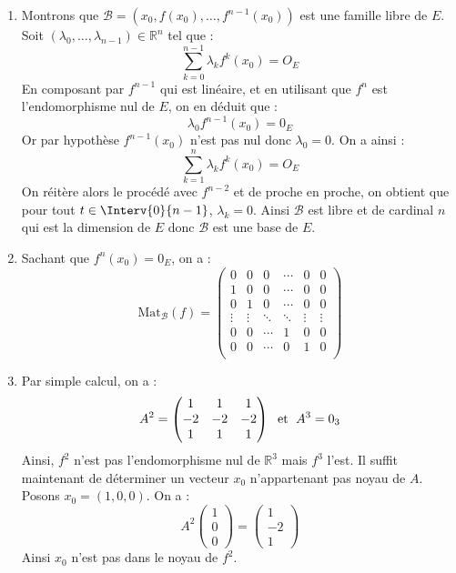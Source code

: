 \documentclass[a4paper,10pt]{report}
\begin{document}
\begin{enumerate}
\item Montrons que $\mathcal{B}= (x_0, f(x_0), \ldots, f^{n-1}(x_0))$ est une famille libre de $E$. Soit $(\lambda_0, \ldots, \lambda_{n-1}) \in \mathbb{R}^n$ tel que :
$$ \sum_{k=0}^{n-1} \lambda_k f^k (x_0) = O_E$$
En composant par $f^{n-1}$ qui est linéaire, et en utilisant que $f^n$ est l'endomorphisme nul de $E$, on en déduit que :
$$ \lambda_0 f^{n-1}(x_0)=0_E$$
Or par hypothèse $f^{n-1}(x_0)$ n'est pas nul donc $\lambda_0=0$. On a ainsi :
$$ \sum_{k=1}^n \lambda_k f^k (x_0) = O_E$$
On réitère alors le procédé avec $f^{n-2}$ et de proche en proche, on obtient que pour tout $t \in \Interv{0}{n-1}$, $\lambda_k=0$. Ainsi $\mathcal{B}$ est libre et de cardinal $n$ qui est la dimension de $E$ donc $\mathcal{B}$ est une base de $E$.
\item Sachant que $f^n(x_0)=0_E$, on a :
$$ \textrm{Mat}_{\mathcal{B}}(f) = \begin{pmatrix}
0 & 0 & 0 & \cdots & 0 & 0 \\
1 & 0 & 0 & \cdots & 0 & 0 \\
0 & 1 & 0 & \cdots & 0& 0 \\
\vdots & \vdots& \ddots    & \ddots &  \vdots & \vdots \\
0 & 0 & \cdots & 1 &0 & 0\\
0 & 0 & \cdots & 0 & 1 & 0 \\
\end{pmatrix}$$

\item Par simple calcul, on a :
$$ A^2  = \begin{pmatrix}
1 & 1 & 1 \\
-2 & -2& -2 \\
1 & 1 & 1 
\end{pmatrix} \; \hbox{ et } \; A^3 = 0_3$$
Ainsi, $f^2$ n'est pas l'endomorphisme nul de $\mathbb{R}^3$ mais $f^3$ l'est. Il suffit maintenant de déterminer un vecteur $x_0$ n'appartenant pas noyau de $A$. Posons $x_0= (1,0,0)$. On a :
$$ A^2 \begin{pmatrix}
1 \\
0\\
0
\end{pmatrix} = \begin{pmatrix}
1 \\
-2 \\
1
\end{pmatrix}$$
Ainsi $x_0$ n'est pas dans le noyau de $f^2$.
\end{enumerate}
\end{document}
